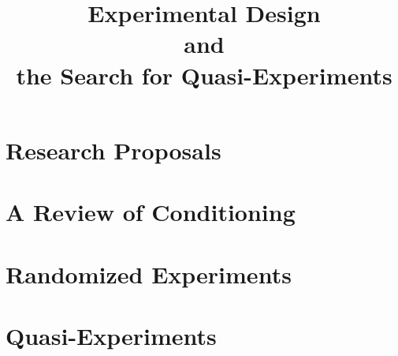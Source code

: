 
\usepackage{tikz}
\usetikzlibrary{shapes,arrows,decorations.pathreplacing,calc}

\title{Experimental Design\\ and\\ the Search for Quasi-Experiments}

\date[]{}



\frame{\titlepage}

\frame{\tableofcontents}

\section{Research Proposals}
\frame{\tableofcontents[currentsection]}



\section[Review]{A Review of Conditioning}
\frame{\tableofcontents[currentsection]}



\section{Randomized Experiments}
\frame{\tableofcontents[currentsection]}



\section{Quasi-Experiments}
\frame{\tableofcontents[currentsection]}






\appendix
\frame{}


